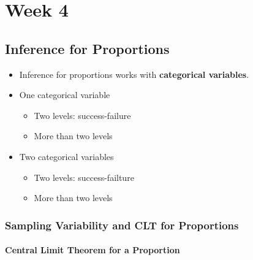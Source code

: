 \documentclass[]{book}
\providecommand{\tightlist}{%
  \setlength{\itemsep}{0pt}\setlength{\parskip}{0pt}}
\begin{document}
\hypertarget{week-4}{%
\chapter*{Week 4}\label{week-4}}

\hypertarget{inference-for-proportions}{%
\section*{Inference for Proportions}\label{inference-for-proportions}}

\begin{itemize}
\tightlist
\item
  Inference for proportions works with \textbf{categorical variables}.
\item
  One categorical variable

  \begin{itemize}
  \tightlist
  \item
    Two levels: success-failure
  \item
    More than two levels
  \end{itemize}
\item
  Two categorical variables

  \begin{itemize}
  \tightlist
  \item
    Two levels: success-failture
  \item
    More than two levels
  \end{itemize}
\end{itemize}

\hypertarget{sampling-variability-and-clt-for-proportions}{%
\subsection*{Sampling Variability and CLT for Proportions}\label{sampling-variability-and-clt-for-proportions}}

\hypertarget{central-limit-theorem-for-a-proportion}{%
\subsubsection*{Central Limit Theorem for a Proportion}\label{central-limit-theorem-for-a-proportion}}
\end{document}
